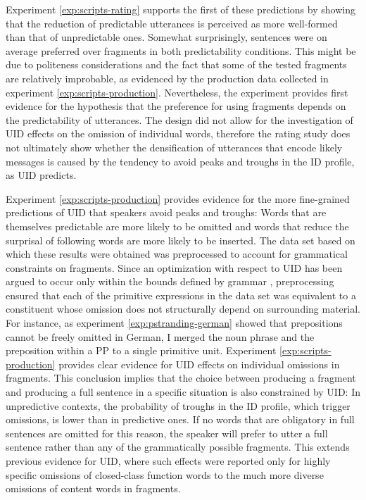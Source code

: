 Experiment \ref{exp:scripts-rating} supports the first of these predictions by showing that the reduction of predictable utterances is perceived as more well-formed than that of unpredictable ones. Somewhat surprisingly, sentences were on average preferred over fragments in both predictability conditions. This might be due to politeness considerations and the fact that some of the tested fragments are relatively improbable, as evidenced by the production data collected in experiment \ref{exp:scripts-production}. Nevertheless, the experiment provides first evidence for the hypothesis that the preference for using fragments depends on the predictability of utterances. The design did not allow for the investigation of UID effects on the omission of individual words, therefore the rating study does not ultimately show whether the densification of utterances that encode likely messages is caused by the tendency to avoid peaks and troughs in the ID profile, as UID predicts.

\largerpage
Experiment \ref{exp:scripts-production} provides evidence for the more fine-grained predictions of UID that speakers avoid peaks and troughs: Words that are themselves predictable are more likely to be omitted and words that reduce the surprisal of following words are more likely to be inserted. The data set based on which these results were obtained was preprocessed to account for grammatical constraints on fragments. Since an optimization with respect to UID has been argued to occur only within the bounds defined by grammar \citep[25]{jaeger2010}, preprocessing ensured that each of the primitive expressions in the data set was equivalent to a constituent whose omission does not structurally depend on surrounding material. For instance, as experiment \ref{exp:pstranding-german} showed that prepositions cannot be freely omitted in German, I merged the noun phrase and the preposition within a PP to a single primitive unit. Experiment \ref{exp:scripts-production} provides clear evidence for UID effects on individual omissions in fragments. This conclusion implies that the choice between producing a fragment and producing a full sentence in a specific situation is also constrained by UID: In unpredictive contexts, the probability of troughs in the ID profile, which trigger omissions, is lower than in predictive ones. If no words that are obligatory in full sentences are omitted for this reason, the speaker will prefer to utter a full sentence rather than any of the grammatically possible fragments. This extends previous evidence for UID, where such effects were reported only for highly specific omissions of closed-class function words to the much more diverse omissions of content words in fragments.

